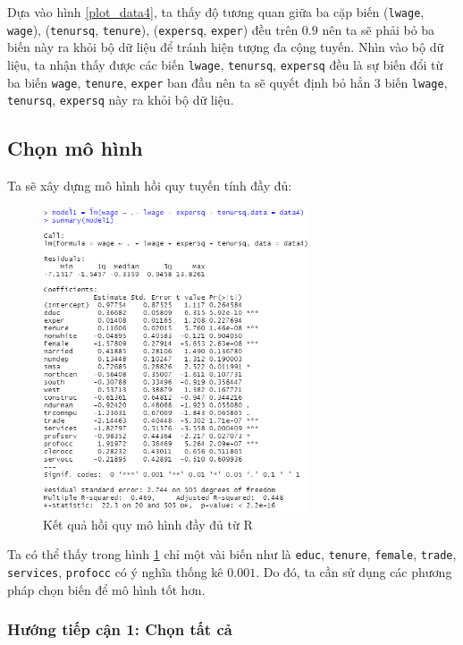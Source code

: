 Dựa vào hình \ref{plot_data4}, ta thấy độ tương quan giữa ba cặp biến (\texttt{lwage}, \texttt{wage}), (\texttt{tenursq}, \texttt{tenure}), (\texttt{expersq}, \texttt{exper}) đều trên $0.9$ nên ta sẽ phải bỏ ba biến này ra khỏi bộ dữ liệu để tránh hiện tượng đa cộng tuyến. Nhìn vào bộ dữ liệu, ta nhận thấy được các biến \texttt{lwage}, \texttt{tenursq}, \texttt{expersq} đều là sự biến đổi từ ba biến \texttt{wage}, \texttt{tenure}, \texttt{exper} ban đầu nên ta sẽ quyết định bỏ hẳn 3 biến \texttt{lwage}, \texttt{tenursq}, \texttt{expersq} này ra khỏi bộ dữ liệu.

\subsection*{Chọn mô hình}

Ta sẽ xây dựng mô hình hồi quy tuyến tính đầy đủ:

\begin{figure}[H]
	\centering
	\includegraphics[width=0.7\textwidth]{../Photo Of Result/full-model-data4}
	\caption{Kết quả hồi quy mô hình đầy đủ từ R}
	\label{full-model}
\end{figure}

Ta có thể thấy trong hình \ref{full-model} chỉ một vài biến như là \texttt{educ}, \texttt{tenure}, \texttt{female}, \texttt{trade}, \texttt{services}, \texttt{profocc} có ý nghĩa thống kê $0.001$. Do đó, ta cần sử dụng các phương pháp chọn biến để mô hình tốt hơn.

\subsubsection*{Hướng tiếp cận 1: Chọn tất cả}

